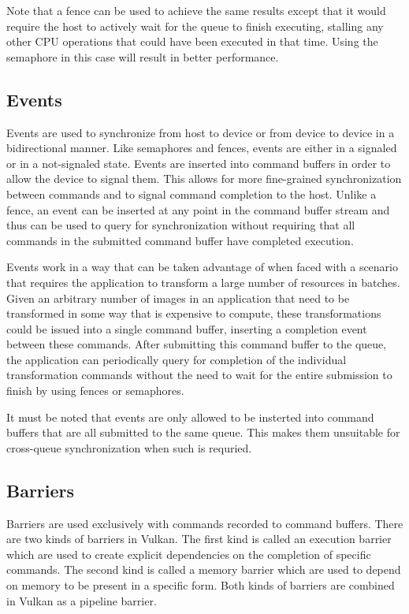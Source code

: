       Note that a fence can be used to achieve the same results except that it would require the \gls{host} to actively wait for the queue to finish executing, stalling any other CPU operations that could have been executed in that time. Using the semaphore in this case will result in better performance.

    \subsection{Events}
    \label{sub:Events}

      Events are used to synchronize from \gls{host} to device or from device to device in a bidirectional manner. Like semaphores and fences, events are either in a signaled or in a not-signaled state. Events are inserted into command buffers in order to allow the device to signal them. This allows for more fine-grained synchronization between commands and to signal command completion to the \gls{host}. Unlike a fence, an event can be inserted at any point in the command buffer stream and thus can be used to query for synchronization without requiring that all commands in the submitted command buffer have completed execution.

      Events work in a way that can be taken advantage of when faced with a scenario that requires the \gls{application} to transform a large number of resources in batches. Given an arbitrary number of images in an \gls{application} that need to be transformed in some way that is expensive to compute, these transformations could be issued into a single command buffer, inserting a completion event between these commands. After submitting this command buffer to the queue, the \gls{application} can periodically query for completion of the individual transformation commands without the need to wait for the entire submission to finish by using fences or semaphores.

      It must be noted that events are only allowed to be insterted into command buffers that are all submitted to the same queue. This makes them unsuitable for cross-queue synchronization when such is requried.

    \subsection{Barriers}
    \label{sub:Barriers}
      Barriers are used exclusively with commands recorded to command buffers. There are two kinds of barriers in Vulkan. The first kind is called an execution barrier which are used to create explicit dependencies on the completion of specific commands. The second kind is called a memory barrier which are used to depend on memory to be present in a specific form. Both kinds of barriers are combined in Vulkan as a pipeline barrier.

